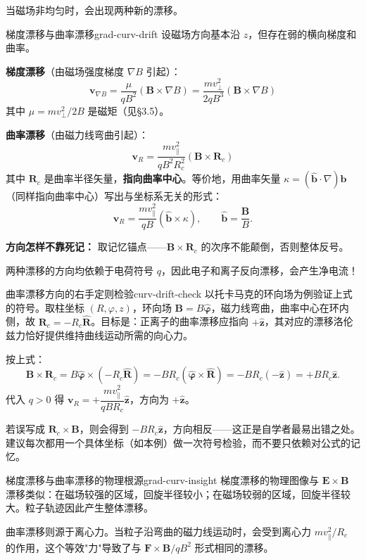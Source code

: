 \documentclass[12pt,a4paper,openany,oneside]{book}
\newcommand{\vect}[1]{\bm{#1}}
\newcommand{\unitvec}[1]{\hat{\vect{#1}}}
\newcommand{\grad}{\nabla}
\begin{document}
当磁场非均匀时，会出现两种新的漂移。

\begin{theorem}{梯度漂移与曲率漂移}{grad-curv-drift}
设磁场方向基本沿 $z$，但存在弱的横向梯度和曲率。

\textbf{梯度漂移}（由磁场强度梯度 $\grad B$ 引起）：
\[
\vect{v}_{\nabla B} = \frac{\mu}{qB^2}(\vect{B}\times\grad B) = \frac{m v_\perp^2}{2qB^3}(\vect{B}\times\grad B)
\]
其中 $\mu = mv_\perp^2/2B$ 是磁矩（见\S3.5）。

\textbf{曲率漂移}（由磁力线弯曲引起）：
\[
\vect{v}_R = \frac{m v_\parallel^2}{qB^2 R_c^2}(\vect{B}\times\vect{R}_c)
\]
其中 $\vect{R}_c$ 是曲率半径矢量，\textbf{指向曲率中心}。等价地，用曲率矢量 $\kappa=(\unitvec{b}\cdot\grad)\unitvec{b}$（同样指向曲率中心）写出与坐标系无关的形式：
\[
\vect{v}_R = \frac{m v_\parallel^2}{qB}(\unitvec{b}\times\kappa),
\qquad \unitvec{b}=\frac{\vect{B}}{B}.
\]

\textbf{方向怎样不靠死记：} 取记忆锚点——$\vect{B}\times\vect{R}_c$ 的次序不能颠倒，否则整体反号。

两种漂移的方向均依赖于电荷符号 $q$，因此电子和离子反向漂移，会产生净电流！
\end{theorem}

\begin{insight}{曲率漂移方向的右手定则检验}{curv-drift-check}
以托卡马克的环向场为例验证上式的符号。取柱坐标 $(R,\varphi,z)$，环向场 $\vect{B}=B\unitvec{\varphi}$，磁力线弯曲，曲率中心在环内侧，故 $\vect{R}_c=-R_c\unitvec{R}$。目标是：正离子的曲率漂移应指向 $+\unitvec{z}$，其对应的漂移洛伦兹力恰好提供维持曲线运动所需的向心力。

按上式：
\[
\vect{B}\times\vect{R}_c = B\unitvec{\varphi}\times(-R_c\unitvec{R})
= -BR_c(\unitvec{\varphi}\times\unitvec{R})
= -BR_c(-\unitvec{z}) = +BR_c\unitvec{z}.
\]
代入 $q>0$ 得 $\vect{v}_R = +\dfrac{mv_\parallel^2}{qBR_c}\unitvec{z}$，方向为 $+\unitvec{z}$。

若误写成 $\vect{R}_c\times\vect{B}$，则会得到 $-BR_c\unitvec{z}$，方向相反——这正是自学者最易出错之处。建议每次都用一个具体坐标（如本例）做一次符号检验，而不要只依赖对公式的记忆。
\end{insight}

\begin{insight}{梯度漂移与曲率漂移的物理根源}{grad-curv-insight}
梯度漂移的物理图像与 $\vect{E}\times\vect{B}$ 漂移类似：在磁场较强的区域，回旋半径较小；在磁场较弱的区域，回旋半径较大。粒子轨迹因此产生整体漂移。

曲率漂移则源于离心力。当粒子沿弯曲的磁力线运动时，会受到离心力 $m v_\parallel^2/R_c$ 的作用，这个等效"力"导致了与 $\vect{F}\times\vect{B}/qB^2$ 形式相同的漂移。
\end{insight}
\end{document}
